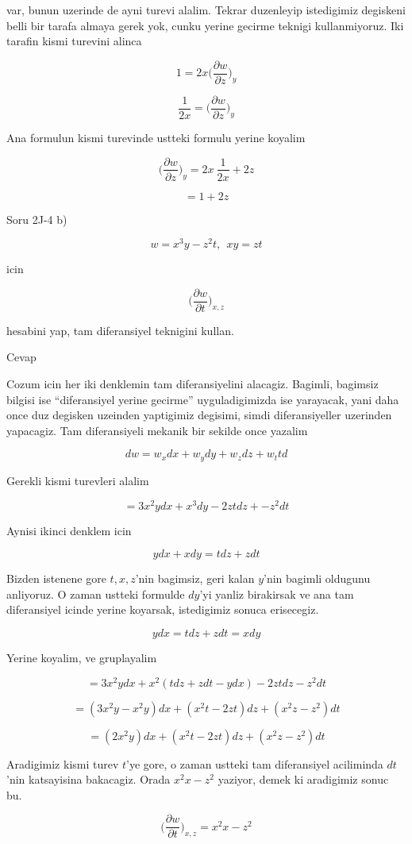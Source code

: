 \documentclass[12pt,fleqn]{article}
\begin{document}
var, bunun uzerinde de ayni turevi alalim. Tekrar duzenleyip istedigimiz
degiskeni belli bir tarafa almaya gerek yok, cunku yerine gecirme teknigi
kullanmiyoruz. Iki tarafin kismi turevini alinca

\[ 1 = 2x  \bigg( \frac{\partial w}{\partial z}  \bigg)_y  \]

\[ \frac{ 1}{2x}  = \bigg( \frac{\partial w}{\partial z}  \bigg)_y  \]

Ana formulun kismi turevinde ustteki formulu yerine koyalim

\[  \bigg( \frac{\partial w}{\partial z}  \bigg)_y  =
2x \  \frac{1}{2x}  + 2z
 \]

\[   =
1 + 2z
 \]

Soru 2J-4 b)

\[ w = x^3y - z^2t, \ \ xy = zt\]

icin

\[ \bigg( \frac{\partial w}{\partial t}  \bigg)_{x,z}  \]

hesabini yap, tam diferansiyel teknigini kullan. 

Cevap

Cozum icin her iki denklemin tam diferansiyelini alacagiz. Bagimli,
bagimsiz bilgisi ise ``diferansiyel yerine gecirme'' uyguladigimizda ise
yarayacak, yani daha once duz degisken uzeinden yaptigimiz degisimi, simdi
diferansiyeller uzerinden yapacagiz. Tam diferansiyeli mekanik bir sekilde
once yazalim

\[ dw = w_x dx + w_y dy + w_z dz + w_t td \]

Gerekli kismi turevleri alalim

\[ = 3x^2y dx + x^3dy - 2zt dz + -z^2 dt\]

Aynisi ikinci denklem icin 

\[ y dx + x dy = t dz + z dt \]

Bizden istenene gore $t,x,z$'nin bagimsiz, geri kalan $y$'nin bagimli
oldugunu anliyoruz. O zaman ustteki formulde $dy$'yi yanliz birakirsak ve
ana tam diferansiyel icinde yerine koyarsak, istedigimiz sonuca
erisecegiz. 

\[ y dx  = t dz + z dt = x dy\]

Yerine koyalim, ve gruplayalim

\[ = 3x^2ydx + x^2(tdz + zdt - ydx) - 2ztdz - z^2dt \]

\[ = (3x^2y  - x^2y)dx + (x^2t-2zt)dz + (x^2z-z^2)dt  \]

\[ = (2x^2y) dx + (x^2t-2zt) dz + (x^2z-z^2)dt  \]

Aradigimiz kismi turev $t$'ye gore, o zaman ustteki tam diferansiyel
aciliminda $dt$'nin katsayisina bakacagiz. Orada $x^2x-z^2$ yaziyor, demek
ki aradigimiz sonuc bu. 

\[ \bigg( \frac{\partial w}{\partial t}  \bigg)_{x,z} = x^2x-z^2 \]
\end{document}
